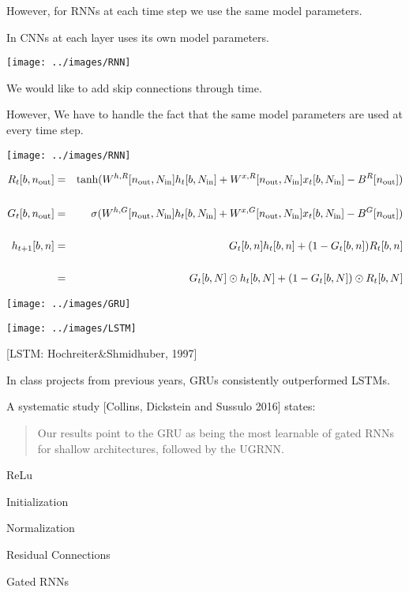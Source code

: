 {\vfill
However, for RNNs {\color{red} at each time step we use the same model parameters.}

\vfill
In CNNs {\color{red} at each layer uses its own model parameters.}


\centerline{\texttt{[image: ../images/RNN]}}

\vfill
We would like to add {\color{red} skip connections through time}.

\vfill
However, We have to handle the fact that the same model parameters are used at every time step.

\centerline{\texttt{[image: ../images/RNN]}}

{\huge
\vfill
\begin{eqnarray*}
R_t[b,n_{\mathrm{out}}] & = & \mathrm{tanh}(W^{h,R}[n_{\mathrm{out}},N_{\mathrm{in}}]h_t[b,N_{\mathrm{in}}] + W^{x,R}[n_{\mathrm{out}},N_{\mathrm{in}}]x_t[b,N_{\mathrm{in}}] - B^R[n_{\mathrm{out}}]) \\
\\
G_t[b,n_{\mathrm{out}}] & = & \;\;\;\;\sigma(W^{h,G}[n_{\mathrm{out}},N_{\mathrm{in}}]h_t[b,N_{\mathrm{in}}] + W^{x,G}[n_{\mathrm{out}},N_{\mathrm{in}}]x_t[b,N_{\mathrm{in}}] - B^G[n_{\mathrm{out}}]) \\
\\
h_{t+1}[b,n] & = & G_t[b,n]h_t[b,n] + (1-G_t[b,n])R_t[b,n] \\
\\
 & = & G_t[b,N] \odot h_t[b,N] + (1-G_t[b,N])\odot R_t[b,N]
\end{eqnarray*}
}


\centerline{\texttt{[image: ../images/GRU]}}

\centerline{\texttt{[image: ../images/LSTM]}}

\centerline{\Large [LSTM: Hochreiter\&Shmidhuber, 1997]}


\vfill
In class projects from previous years, GRUs consistently outperformed LSTMs.

\vfill
A systematic study [Collins, Dickstein and Sussulo 2016] states:

\begin{quotation}
  Our results point to the GRU as being the most learnable of gated RNNs for shallow architectures, followed by the UGRNN.
\end{quotation}

  \centerline{ReLu}
  \vfill
  \centerline{Initialization}
  \vfill
  \centerline{Normalization}
  \vfill
  \centerline{Residual Connections}
  \vfill
  \centerline{Gated RNNs}


}

